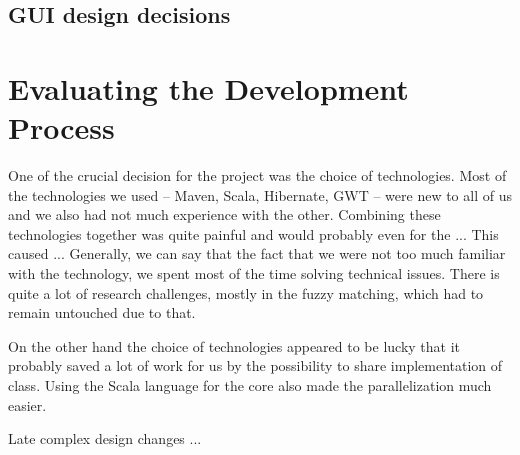 \subsection{GUI design decisions}

\section{Evaluating the Development Process}

One of the crucial decision for the project was the choice of technologies. Most of the technologies we used -- Maven, Scala, Hibernate, GWT -- were new to all of us and we also had not much experience with the other. Combining these technologies together was quite painful and would probably even for the ... This caused ... Generally, we can say that the fact that we were not too much familiar with the technology, we spent most of the time solving technical issues. There is quite a lot of research challenges, mostly in the fuzzy matching, which had to remain untouched due to that.

On the other hand the choice of technologies appeared to be lucky that it probably saved a lot of work for us by the possibility to share implementation of class. Using the Scala language for the core also made the parallelization much easier.

Late complex design changes ...





